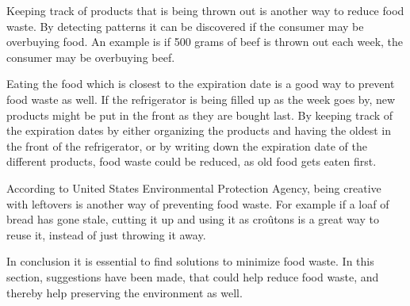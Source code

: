 Keeping track of products that is being thrown out is another way to reduce food waste. By detecting patterns it can be discovered if the consumer may be overbuying food. An example is if 500 grams of beef is thrown out each week, the consumer may be overbuying beef\cite{madSpild_Greatist}.

Eating the food which is closest to the expiration date is a good way to prevent food waste as well. If the refrigerator is being filled up as the week goes by, new products might be put in the front as they are bought last. By keeping track of the expiration dates by either organizing the products and having the oldest in the front of the refrigerator, or by writing down the expiration date of the different products, food waste could be reduced, as old food gets eaten first.

According to United States Environmental Protection Agency\cite{madSpild_EPA}, being creative with leftovers is another way of preventing food waste. For example if a loaf of bread has gone stale, cutting it up and using it as croûtons is a great way to reuse it, instead of just throwing it away.

In conclusion it is essential to find solutions to minimize food waste. In this section, suggestions have been made, that could help reduce food waste, and thereby help preserving the environment as well.